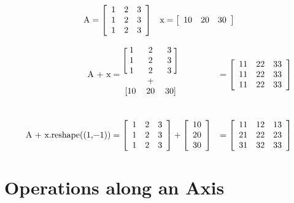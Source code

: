 \begin{align*}
\text{\li{A}} = \left[\begin{array}{ccc}
1 & 2 & 3\\
1 & 2 & 3\\
1 & 2 & 3\\
\end{array}\right]
&&
\text{\li{x}} = \left[\begin{array}{ccc}
10 & 20 & 30
\end{array}\right]
\end{align*}

\begin{align*}
\text{\li{A + x}}
&= \begin{blockarray}{ccc}
\begin{block}{[ccc]}
1 & 2 & 3\\
1 & 2 & 3\\
1 & 2 & 3\\
\end{block}
  & + &  \\
\begin{block}{[ccc]}
10 & 20 & 30\\
\end{block}
\end{blockarray}
&= \left[\begin{array}{ccc}
11 & 22 & 33\\
11 & 22 & 33\\
11 & 22 & 33
\end{array}\right]
\\ \\
\text{\li{A + x.reshape((1,-1))}}
&= \left[\begin{array}{ccc}
1 & 2 & 3 \\
1 & 2 & 3 \\
1 & 2 & 3 \\
\end{array}\right]
+ \left[\begin{array}{c}
10 \\ 20 \\ 30\\
\end{array}\right]
&= \left[\begin{array}{ccc}
11 & 12 & 13\\
21 & 22 & 23\\
31 & 32 & 33\\
\end{array}\right]
\end{align*}

\section*{Operations along an Axis} %

